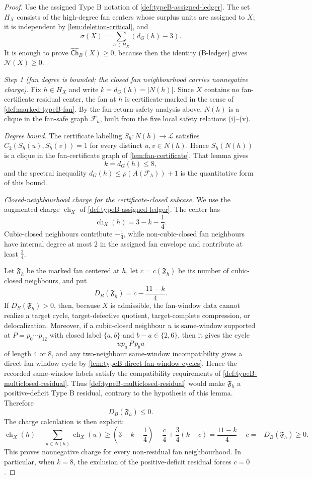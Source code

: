\documentclass[11pt]{article}
\newcommand{\labels}{\mathcal L}
\newcommand{\ch}{\operatorname{ch}}
\newcommand{\Ch}{\mathsf{Ch}}
\newcommand{\No}{\mathcal N}
\newcommand{\Fsafe}{\mathcal F}
\begin{document}
\begin{proof}
Use the assigned Type B notation of \cref{def:typeB-assigned-ledger}.  The set
$H_X$ consists of the high-degree fan centers whose surplus units are assigned
to $X$; it is independent by \cref{lem:deletion-critical}, and
\[
\sigma(X)=\sum_{h\in H_X}(d_G(h)-3).
\]
It is enough to prove $\widehat{\Ch}_B(X)\ge0$, because then the identity
\textup{(B-ledger)} gives $\No(X)\ge0$.

\emph{Step 1 (fan degree is bounded; the closed fan neighbourhood carries nonnegative charge).}
Fix $h\in H_X$ and write $k=d_G(h)=|N(h)|$.  Since $X$ contains no
fan-certificate residual center, the fan at $h$ is certificate-marked in the
sense of \cref{def:marked-typeB-fan}.  By the fan-return-safety analysis above,
$N(h)$ is a clique in the fan-safe graph $\Fsafe_h$, built from the five local
safety relations (i)--(v).

\emph{Degree bound.}  The certificate labelling
$S_h:N(h)\to\labels$ satisfies $C_2(S_h(u),S_h(v))=1$ for every distinct
$u,v\in N(h)$.  Hence $S_h(N(h))$ is a clique in the fan-certificate graph of
\cref{lem:fan-certificate}.  That lemma gives
\[
k=d_G(h)\le 8 ,
\]
and the spectral inequality
$d_G(h)\le\rho(A(\Fsafe_h))+1$ is the quantitative form of this bound.

\emph{Closed-neighbourhood charge for the certificate-closed subcase.}  We use
the augmented charge $\ch_X$ of \cref{def:typeB-assigned-ledger}.  The center
has
\[
\ch_X(h)=3-k-\frac14.
\]
Cubic-closed neighbours contribute $-\tfrac14$, while non-cubic-closed fan
neighbours have internal degree at most $2$ in the assigned fan envelope and
contribute at least $\tfrac34$.

Let $\mathfrak F_h$ be the marked fan centered at $h$, let
$c=c(\mathfrak F_h)$ be its number of cubic-closed neighbours, and put
\[
D_B(\mathfrak F_h)=c-\frac{11-k}{4}.
\]
If $D_B(\mathfrak F_h)>0$, then, because $X$ is admissible, the fan-window data
cannot realize a target cycle, target-defective quotient, target-complete
compression, or delocalization.  Moreover, if a cubic-closed neighbour $u$ is
same-window supported at $P=p_0\cdots p_{12}$ with closed label
$\{a,b\}$ and $b-a\in\{2,6\}$, then it gives the cycle
\[
u p_a\,P\,p_b u
\]
of length $4$ or $8$, and any two-neighbour same-window incompatibility gives a
direct fan-window cycle by \cref{lem:typeB-direct-fan-window-cycles}.  Hence the
recorded same-window labels satisfy the compatibility requirements of
\cref{def:typeB-multiclosed-residual}.  Thus
\cref{def:typeB-multiclosed-residual} would make $\mathfrak F_h$ a
positive-deficit Type B residual, contrary to the hypothesis of this lemma.
Therefore
\[
D_B(\mathfrak F_h)\le0.
\]
The charge calculation is then explicit:
\[
\ch_X(h)+\sum_{u\in N(h)}\ch_X(u)
\ge
\left(3-k-\frac14\right)-\frac c4+\frac34(k-c)
=\frac{11-k}{4}-c
=-D_B(\mathfrak F_h)\ge0 .
\]
This proves nonnegative charge for every non-residual fan neighbourhood.  In
particular, when $k=8$, the exclusion of the positive-deficit residual forces
$c=0$.


\end{proof}
\end{document}

